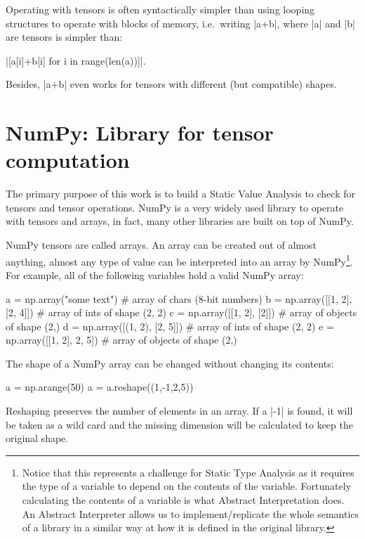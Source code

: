 Operating with tensors is often syntactically simpler than using looping
structures to operate with blocks of memory, i.e.~writing \pycode|a+b|,
where \pycode|a| and \pycode|b| are tensors is simpler than:

\pycode|[a[i]+b[i] for i in range(len(a))]|.

Besides, \pycode|a+b| even works for tensors with different (but compatible) shapes.

\section{NumPy: Library for tensor computation}
\label{numpy-library-for-tensor-computation}

The primary purpose of this work is to build a Static Value Analysis to check for tensors
and tensor operations. NumPy \autocite{oliphant2006guide} is a very widely used library to
operate with tensors and arrays, in fact, many other libraries are built on top of NumPy.

NumPy tensors are called arrays. An array can be created out of almost
anything, almost any type of value can be interpreted into an array by
NumPy\footnote{Notice that this represents a challenge for Static Type
  Analysis as it requires the type of a variable to depend on the
  contents of the variable. Fortunately calculating the contents of a
  variable is what Abstract Interpretation does. An Abstract Interpreter
  allows us to implement/replicate the whole semantics of a library in a
  similar way at how it is defined in the original library.}. For
example, all of the following variables hold a valid NumPy array:

\begin{pythoncode}
a = np.array("some text")       # array of chars (8-bit numbers)
b = np.array([[1, 2], [2, 4]])  # array of ints of shape (2, 2)
c = np.array([[1, 2], [2]])     # array of objects of shape (2,)
d = np.array([(1, 2), [2, 5]])  # array of ints of shape (2, 2)
e = np.array([[1, 2], {2, 5}])  # array of objects of shape (2,)
\end{pythoncode}

The shape of a NumPy array can be changed without changing its contents:

\begin{pythoncode}
a = np.arange(50)
a = a.reshape((1,-1,2,5))
\end{pythoncode}

Reshaping preserves the number of elements in an array. If a
\pycode|-1| is found, it will be taken as a wild card and the missing
dimension will be calculated to keep the original shape.

